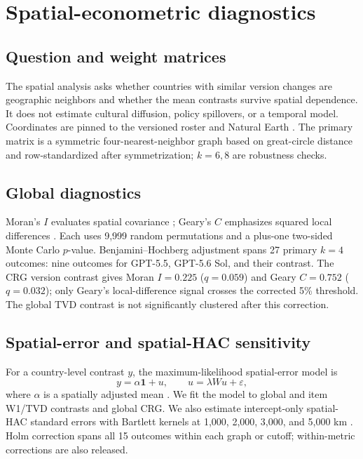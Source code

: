 \section{Spatial-econometric diagnostics}
\label{app:spatial}

\subsection{Question and weight matrices}
The spatial analysis asks whether countries with similar version changes are geographic
neighbors and whether the mean contrasts survive spatial dependence. It does not estimate
cultural diffusion, policy spillovers, or a temporal model. Coordinates are pinned to
the versioned roster and Natural Earth \citep{naturalearth}. The primary matrix is a
symmetric four-nearest-neighbor graph based on great-circle distance and row-standardized
after symmetrization; $k=6,8$ are robustness checks.

\subsection{Global diagnostics}
Moran's $I$ evaluates spatial covariance \citep{moran1950notes}; Geary's $C$ emphasizes
squared local differences \citep{geary1954contiguity}. Each uses 9,999 random
permutations and a plus-one two-sided Monte Carlo $p$-value. Benjamini--Hochberg
adjustment spans 27 primary $k=4$ outcomes: nine outcomes for GPT-5.5, GPT-5.6 Sol, and
their contrast. The CRG version contrast gives Moran $I=0.225$ ($q=0.059$) and Geary
$C=0.752$ ($q=0.032$); only Geary's local-difference signal crosses the corrected 5\%
threshold. The global TVD contrast is not significantly clustered after this correction.

\subsection{Spatial-error and spatial-HAC sensitivity}
For a country-level contrast $y$, the maximum-likelihood spatial-error model is
\[
y=\alpha\mathbf 1+u,\qquad u=\lambda Wu+\varepsilon,
\]
where $\alpha$ is a spatially adjusted mean \citep{anselin1988spatial}. We fit the model
to global and item W1/TVD contrasts and global CRG. We also estimate intercept-only
spatial-HAC standard errors with Bartlett kernels at 1,000, 2,000, 3,000, and 5,000 km
\citep{conley1999gmm}. Holm correction spans all 15 outcomes within each graph or cutoff;
within-metric corrections are also released.

